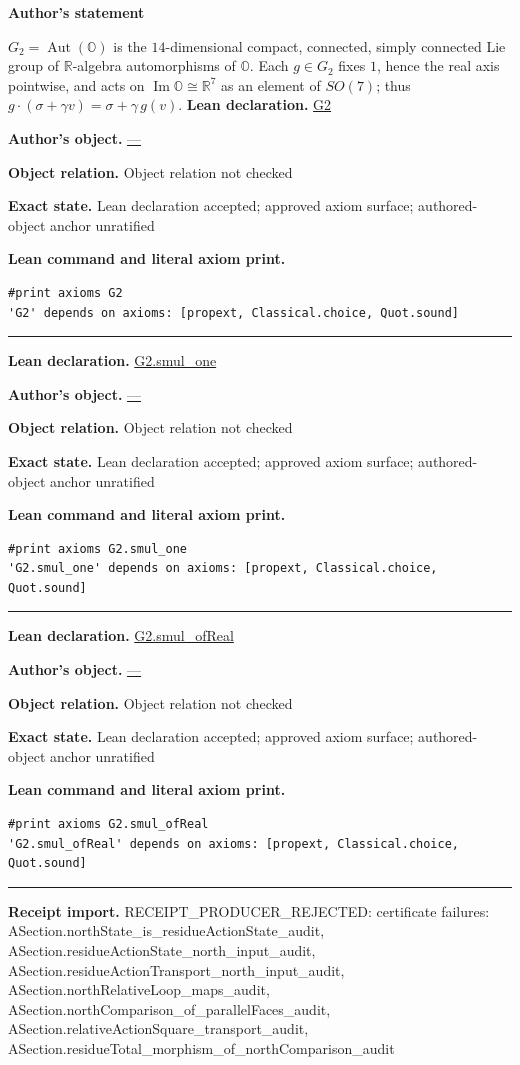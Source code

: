 \documentclass[11pt]{article}
\newcommand{\OO}{\mathbb{O}}
\newcommand{\RR}{\mathbb{R}}
\DeclareMathOperator{\Aut}{Aut}
\DeclareMathOperator{\im}{Im}
\providecommand{\Gtwo}{G_2}
\theoremstyle{plain}
\theoremstyle{definition}
\theoremstyle{remark}
\begin{document}
\begin{tcolorbox}[provenancecard,title={31. Definition - The automorphism group \$\textbackslash{}Gtwo\$},title after break={31. Definition - The automorphism group \$\textbackslash{}Gtwo\$ (continued)}]
\textbf{Author's statement}\par
$\Gtwo=\Aut(\OO)$ is the $14$-dimensional compact, connected, simply connected Lie group of
$\RR$-algebra automorphisms of $\OO$. Each $g\in\Gtwo$ fixes $1$, hence the real axis pointwise, and
acts on $\im\OO\cong\RR^7$ as an element of $SO(7)$; thus $g\cdot(\sigma+\gamma v)=\sigma+\gamma\,g(v)$.
\tcblower
\textbf{Lean declaration.} \url{G2}
\par\textbf{Author's object.} \url{—}
\par\textbf{Object relation.} Object relation not checked
\par\textbf{Exact state.} Lean declaration accepted; approved axiom surface; authored-object anchor unratified
\par\smallskip\textbf{Lean command and literal axiom print.}
\begin{Verbatim}[breaklines=true,breakanywhere=true,fontsize=\small]
#print axioms G2
'G2' depends on axioms: [propext, Classical.choice, Quot.sound]
\end{Verbatim}
\medskip\hrule\medskip
\textbf{Lean declaration.} \url{G2.smul_one}
\par\textbf{Author's object.} \url{—}
\par\textbf{Object relation.} Object relation not checked
\par\textbf{Exact state.} Lean declaration accepted; approved axiom surface; authored-object anchor unratified
\par\smallskip\textbf{Lean command and literal axiom print.}
\begin{Verbatim}[breaklines=true,breakanywhere=true,fontsize=\small]
#print axioms G2.smul_one
'G2.smul_one' depends on axioms: [propext, Classical.choice, Quot.sound]
\end{Verbatim}
\medskip\hrule\medskip
\textbf{Lean declaration.} \url{G2.smul_ofReal}
\par\textbf{Author's object.} \url{—}
\par\textbf{Object relation.} Object relation not checked
\par\textbf{Exact state.} Lean declaration accepted; approved axiom surface; authored-object anchor unratified
\par\smallskip\textbf{Lean command and literal axiom print.}
\begin{Verbatim}[breaklines=true,breakanywhere=true,fontsize=\small]
#print axioms G2.smul_ofReal
'G2.smul_ofReal' depends on axioms: [propext, Classical.choice, Quot.sound]
\end{Verbatim}
\medskip\hrule\medskip
\textbf{Receipt import.} \textcolor{KgtRed}{RECEIPT\_PRODUCER\_REJECTED: certificate failures: ASection.northState\_is\_residueActionState\_audit, ASection.residueActionState\_north\_input\_audit, ASection.residueActionTransport\_north\_input\_audit, ASection.northRelativeLoop\_maps\_audit, ASection.northComparison\_of\_parallelFaces\_audit, ASection.relativeActionSquare\_transport\_audit, ASection.residueTotal\_morphism\_of\_northComparison\_audit}
\end{tcolorbox}
\end{document}
